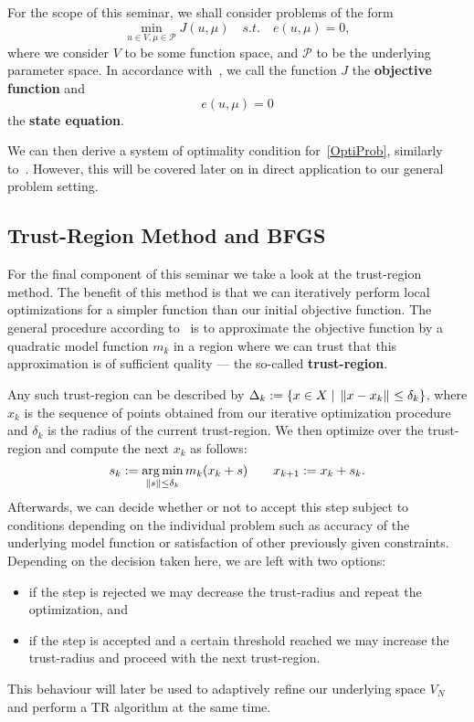 For the scope of this seminar, we shall consider problems of the form
\begin{equation}\label{OptiProb}
    \min\limits_{u \in V, \mu \in \mathcal{P}} J(u, \mu) \quad s.t. \quad e(u, \mu) = 0,
\end{equation}
where we consider $V$ to be some function space, and $\mathcal{P}$ to be the underlying parameter space.
In accordance with~\cite[Subsection 1.1.1 and Equation 1.4; Section 1.6 and Equation 1.81]{Hinze2009}, we call the function $J$ the \textbf{objective function} and
\begin{equation}\label{StateEq}
    e(u, \mu) = 0
\end{equation}
the \textbf{state equation}.

We can then derive a system of optimality condition for~\eqref{OptiProb}, similarly to~\cite[Section 1.7]{Hinze2009}.
However, this will be covered later on in direct application to our general problem setting.

\subsection{Trust-Region Method and BFGS}

For the final component of this seminar we take a look at the trust-region method.
The benefit of this method is that we can iteratively perform local optimizations for a simpler function than our initial objective function.
The general procedure according to~\cite[Section 3.3]{Kelley1999} is to approximate the objective function by a quadratic model function $m_k$ in a region where we can trust that this approximation is of sufficient quality --- the so-called \textbf{trust-region}.

Any such trust-region can be described by $\Delta_k := \{ x \in X \; | \; \left\lVert x - x_k\right\rVert_{} \leq \delta_k \}$, where $x_k$ is the sequence of points obtained from our iterative optimization procedure and $\delta_k$ is the radius of the current trust-region.
We then optimize over the trust-region and compute the next $x_k$ as follows:
\begin{equation}\label{TROpti}
    s_k := \operatorname*{arg\,min}\limits_{\left\lVert s\right\rVert_{} \leq \delta_k} m_k(x_k + s) \qquad x_{k + 1} := x_k + s_k.
\end{equation}
Afterwards, we can decide whether or not to accept this step subject to conditions depending on the individual problem such as accuracy of the underlying model function or satisfaction of other previously given constraints.
Depending on the decision taken here, we are left with two options:
\begin{itemize}
    \item if the step is rejected we may decrease the trust-radius and repeat the optimization, and
    \item if the step is accepted and a certain threshold reached we may increase the trust-radius and proceed with the next trust-region.
\end{itemize}
This behaviour will later be used to adaptively refine our underlying space $V_N$ and perform a TR algorithm at the same time.

